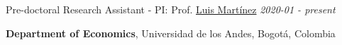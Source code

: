 \documentclass[margin,line]{res}
\begin{document}
\begin{resume}
\vspace{-.2cm}
{Pre-doctoral Research Assistant - PI: Prof. \href{https://sites.google.com/site/lrmartineza}{Luis Martínez}  \hfill \emph{2020-01 - present}} \\

\vspace{-.6cm}
	
{\bf Department of Economics}, Universidad de los Andes, Bogotá, Colombia


\end{resume}
\end{document}

